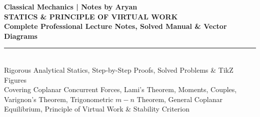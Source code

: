 \documentclass[11pt,a4paper]{article}
\begin{document}
\begin{titlepage}
    \centering
    \vspace*{0.5cm}
    {\large\sffamily\color{secondary}\textbf{Classical Mechanics | Notes by Aryan}}\\[1.0cm]
    {\Huge\bfseries\color{primary} STATICS \& PRINCIPLE OF VIRTUAL WORK}\\[0.4cm]
    {\Large\bfseries\color{secondary} Complete Professional Lecture Notes, Solved Manual \& Vector Diagrams}\\[0.8cm]
    \rule{0.8\textwidth}{1.5pt}\\[1cm]
    {\large\sffamily Rigorous Analytical Statics, Step-by-Step Proofs, Solved Problems \& TikZ Figures}\\[0.4cm]
    {\small\sffamily Covering Coplanar Concurrent Forces, Lami's Theorem, Moments, Couples, Varignon's Theorem, Trigonometric $m-n$ Theorem, General Coplanar Equilibrium, Principle of Virtual Work \& Stability Criterion}\\[1.2cm]
    

\end{titlepage}
\end{document}
